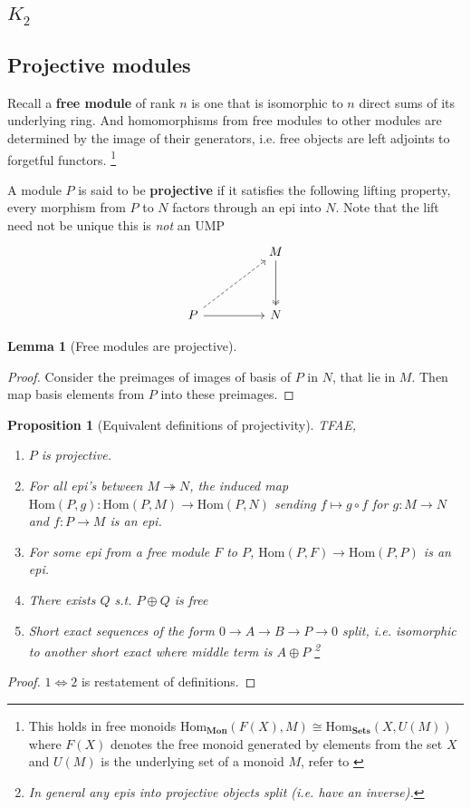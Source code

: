 \documentclass[12pt]{article}
\numberwithin{equation}{section}
\newcommand{\Hom}{{\mathrm{Hom}}}
\newtheorem{lemma}[theorem]{Lemma}
\newtheorem{proposition}{Proposition}[section]
\begin{document}
	\subsection{$K_2$}
	
	\begin{appendices}
	\section{Projective modules}
	Recall a\textbf{ free module} of rank $n$ is one that is isomorphic to $n$ direct sums of its underlying ring. And homomorphisms from free modules to other modules are determined by the image of their generators, i.e. free objects are left adjoints to forgetful functors. \footnote{This holds in free monoids $\mathrm{Hom}_\mathbf{Mon}(F(X), M) \cong \mathrm{Hom}_\mathbf{Sets} (X, U(M))$ where $F(X)$ denotes the free monoid generated by elements from the set $X$ and $U(M)$ is the underlying set of a monoid $M$, refer to \cite[p. ~208]{Awodey} }
	
	A module $P$ is said to be \textbf{projective} if it satisfies the following lifting property, every morphism from $P$ to $N$ factors through an epi into $N$. Note that the lift need not be unique this is \textit{not} an UMP
	\[\begin{tikzcd}
		&& M \\
		\\
		P && N
		\arrow[two heads, from=1-3, to=3-3]
		\arrow[from=3-1, to=3-3]
		\arrow[dashed, from=3-1, to=1-3]
	\end{tikzcd}\]
	\begin{lemma}[Free modules are projective]
	\end{lemma}
	\begin{proof}
		Consider the preimages of images of basis of $P$ in $N$, that lie in $M$. Then map basis elements from $P$ into these preimages.
	\end{proof}
	\begin{proposition}[Equivalent definitions of projectivity]
		TFAE,
		\begin{enumerate}
			\item $P$ is projective.
			\item For all epi's between $M\twoheadrightarrow N$, the induced map $\Hom(P,g):\mathrm{Hom}(P,M) \to \mathrm{Hom}(P,N)$ sending $f \mapsto g \circ f$ for $g:M \to N$ and $f:P \to M$ is an epi.
			\item For some epi from a free module $F$ to $P$, $\mathrm{Hom}(P,F) \to \mathrm{Hom}(P,P)$ is an epi.
			\item There exists $Q$ s.t. $P \oplus Q$ is free
			\item Short exact sequences of the form $0 \to A \to B \to P \to 0$ split, i.e. isomorphic to another short exact where middle term is $A \oplus P$ \footnote{In general any epis into projective objects split (i.e. have an inverse).}
		\end{enumerate}
	\end{proposition}
	\begin{proof}
		$1 \iff 2$ is restatement of definitions.
		

\end{proof}
\end{appendices}
\end{document}
